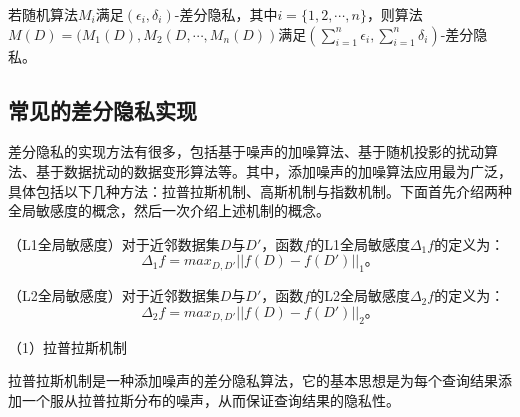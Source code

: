 \begin{theorem}\cite{Algorithmic_Foundations_of_DP}
	若随机算法$M_i$满足$(\epsilon_i, \delta_i)$-差分隐私，其中$i=\{1,2,\cdots,n\}$，则算法$M(D)=(M_1(D),M_2(D,\cdots,M_n(D))$满足$(\sum_{i=1}^{n}\epsilon_i, \sum_{i=1}^{n}\delta_i)$-差分隐私。
\end{theorem}

%


\subsection{常见的差分隐私实现}

差分隐私的实现方法有很多，包括基于噪声的加噪算法、基于随机投影的扰动算法、基于数据扰动的数据变形算法等。其中，添加噪声的加噪算法应用最为广泛，具体包括以下几种方法：拉普拉斯机制\cite{LaplaceM}、高斯机制\cite{Algorithmic_Foundations_of_DP}与指数机制\cite{Mechanism_DP}。下面首先介绍两种全局敏感度的概念，然后一次介绍上述机制的概念。

\begin{definition}
	（L1全局敏感度\cite{Algorithmic_Foundations_of_DP}）对于近邻数据集$D$与$D'$，函数$f$的L1全局敏感度$\Delta_1f$的定义为：
	\begin{equation}
		\Delta_1f=max_{D,D'}||f(D)-f(D')||_1\text{。}
	\end{equation}
\end{definition}

\begin{definition}
	（L2全局敏感度\cite{Algorithmic_Foundations_of_DP}）对于近邻数据集$D$与$D'$，函数$f$的L2全局敏感度$\Delta_2f$的定义为：
	\begin{equation}
		\Delta_2f=max_{D,D'}||f(D)-f(D')||_2\text{。}
	\end{equation}
\end{definition}


（1）拉普拉斯机制

拉普拉斯机制是一种添加噪声的差分隐私算法，它的基本思想是为每个查询结果添加一个服从拉普拉斯分布的噪声，从而保证查询结果的隐私性。

%
%

